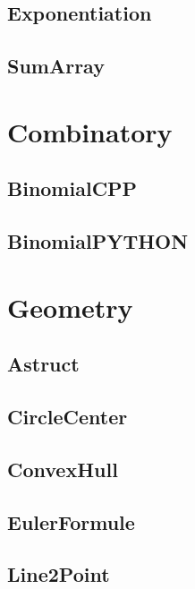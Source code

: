 \subsection{ Exponentiation}
\raggedbottom
\hrulefill
\subsection{ SumArray}
\raggedbottom
\hrulefill

\section{Combinatory}
\subsection{ BinomialCPP}
\raggedbottom
\hrulefill
\subsection{ BinomialPYTHON}
\raggedbottom
\hrulefill

\section{Geometry}
\subsection{ Astruct}
\raggedbottom
\hrulefill
\subsection{ CircleCenter}
\raggedbottom
\hrulefill
\subsection{ ConvexHull}
\raggedbottom
\hrulefill
\subsection{ EulerFormule}
\raggedbottom
\hrulefill
\subsection{ Line2Point}
\raggedbottom
\hrulefill

